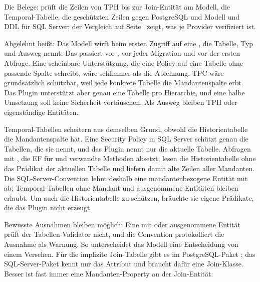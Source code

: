Die Belege:  prüft die Zeilen von TPH bis
zur Join-Entität am Modell,
 die
Temporal-Tabelle,
 die geschützten Zeilen gegen PostgreSQL
und  Modell
und DDL für SQL Server; der Vergleich auf Seite~\pageref{sec:provider-comparison} zeigt, was je
Provider verifiziert ist.

Abgelehnt heißt: Das Modell wirft beim ersten Zugriff auf  eine
, die Tabelle, Typ und Ausweg nennt.
Das passiert vor , vor jeder Migration und vor der ersten
Abfrage. Eine scheinbare Unterstützung, die eine Policy auf eine Tabelle ohne passende Spalte
schreibt, wäre schlimmer als die Ablehnung. TPC wäre grundsätzlich schützbar, weil jede
konkrete Tabelle die Mandantenspalte erbt. Das Plugin unterstützt aber genau eine Tabelle pro
Hierarchie, und eine halbe Umsetzung soll keine Sicherheit vortäuschen. Als Ausweg bleiben TPH
oder eigenständige Entitäten.

Temporal-Tabellen scheitern aus demselben Grund, obwohl die Historientabelle die Mandantenspalte
hat. Eine Security Policy in SQL Server schützt genau die Tabellen, die sie nennt, und das Plugin
nennt nur die aktuelle Tabelle. Abfragen mit , die EF für
 und verwandte Methoden absetzt, lesen die
Historientabelle ohne das Prädikat der aktuellen Tabelle und liefern damit alte Zeilen aller
Mandanten. Die SQL-Server-Convention lehnt deshalb eine mandantenbezogene Entität mit
 ab; Temporal-Tabellen ohne Mandant und
ausgenommene Entitäten bleiben erlaubt. Um auch die Historientabelle zu schützen, bräuchte sie
eigene Prädikate, die das Plugin nicht erzeugt.

Bewusste Ausnahmen bleiben möglich: Eine mit 
oder 
ausgenommene Entität prüft der Tabellen-Validator nicht, und die Convention protokolliert die
Ausnahme als Warnung. So unterscheidet das Modell eine Entscheidung von einem Versehen. Für die implizite
Join-Tabelle gibt es im PostgreSQL-Paket
;
das SQL-Server-Paket kennt nur das Attribut und braucht dafür eine Join-Klasse. Besser ist
fast immer eine Mandanten-Property an der Join-Entität:

